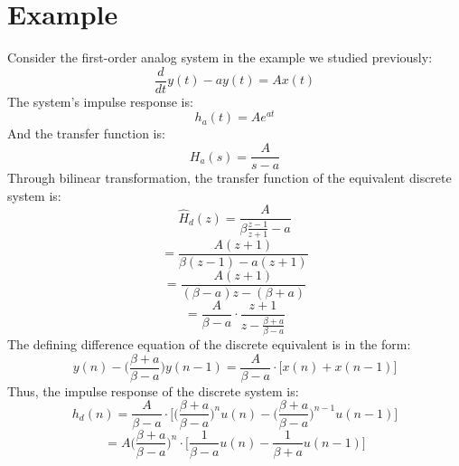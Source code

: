 \documentclass{article}
\begin{document}
\section{Example}
Consider the first-order analog system in the example we studied previously:
\[
\frac{d}{dt}y(t)-ay(t)=Ax(t)
\]
The system's impulse response is:
\[
h_a(t)=Ae^{at}
\]
And the transfer function is:
\[
H_a(s)=\frac{A}{s-a}
\]
Through bilinear transformation, the transfer function of the equivalent discrete system is:
\[
\hat{H}_d(z)=\frac{A}{\beta\frac{z-1}{z+1}-a}
\]
\[
=\frac{A(z+1)}{\beta(z-1)-a(z+1)}
\]
\[
=\frac{A(z+1)}{(\beta-a)z-(\beta+a)}
\]
\[
=\frac{A}{\beta-a}\cdot\frac{z+1}{z-\frac{\beta+a}{\beta-a}}
\]
The defining difference equation of the discrete equivalent is in the form:
\[
y(n)-\bigg(\frac{\beta+a}{\beta-a}\bigg)y(n-1)=\frac{A}{\beta-a}\cdot\bigg[x(n)+x(n-1)\bigg]
\]
Thus, the impulse response of the discrete system is:
\[
h_d(n)=\frac{A}{\beta-a}\cdot\bigg[\bigg(\frac{\beta+a}{\beta-a}\bigg)^nu(n)-\bigg(\frac{\beta+a}{\beta-a}\bigg)^{n-1}u(n-1)\bigg]
\]
\[
=A\bigg(\frac{\beta+a}{\beta-a}\bigg)^n\cdot\bigg[\frac{1}{\beta-a}u(n)-\frac{1}{\beta+a}u(n-1)\bigg]
\]
\newpage
\end{document}
